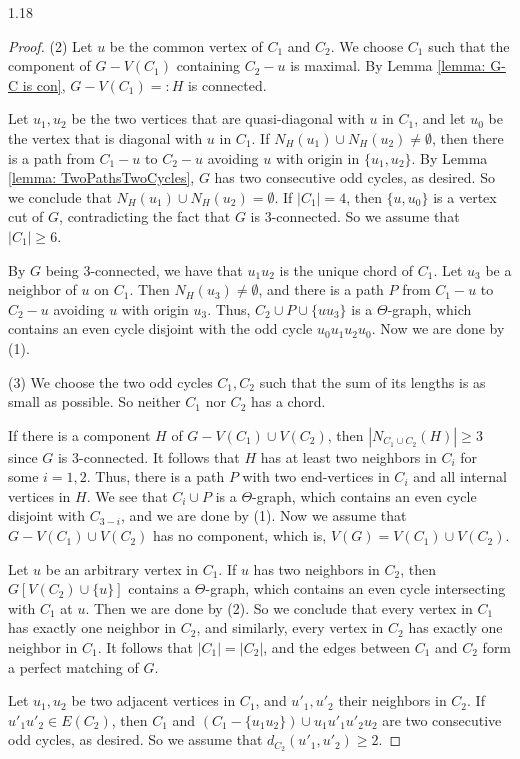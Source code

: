 \documentclass[10pt]{article}
\begin{document}
\begin{spacing}{1.18}
\begin{proof}
    (2) Let $u$ be the common vertex of $C_1$ and $C_2$. We choose $C_1$ such that the component of $G-V(C_1)$ containing $C_2-u$ is maximal. By Lemma \ref{lemma: G-C is con}, $G-V(C_1)=:H$ is connected.

    Let $u_1,u_2$ be the two vertices that are quasi-diagonal with $u$ in $C_1$, and let $u_0$ be the vertex that is diagonal with $u$ in $C_1$. If $N_H(u_1)\cup N_H(u_2)\neq\emptyset$, then there is a path from $C_1-u$ to $C_2-u$ avoiding $u$ with origin in $\{u_1,u_2\}$. By Lemma \ref{lemma: TwoPathsTwoCycles}, $G$ has two consecutive odd cycles, as desired. So we conclude that $N_H(u_1)\cup N_H(u_2)=\emptyset$. If $|C_1|=4$, then $\{u,u_0\}$ is a vertex cut of $G$, contradicting the fact that $G$ is 3-connected. So we assume that $|C_1|\geqslant 6$. 
    
    By $G$ being 3-connected, we have that $u_1u_2$ is the unique chord of $C_1$. Let $u_3$ be a neighbor of $u$ on $C_1$. Then $N_H(u_3)\neq\emptyset$, and there is a path $P$ from $C_1-u$ to $C_2-u$ avoiding $u$ with origin $u_3$. Thus, $C_2\cup P\cup\{uu_3\}$ is a $\varTheta$-graph, which contains an even cycle disjoint with the odd cycle $u_0u_1u_2u_0$. Now we are done by (1).

    (3) We choose the two odd cycles $C_1,C_2$ such that the sum of its lengths is as small as possible. So neither $C_1$ nor $C_2$ has a chord. 
    
    If there is a component $H$ of $G-V(C_1)\cup V(C_2)$, then $|N_{C_1\cup C_2}(H)|\geqslant 3$ since $G$ is 3-connected. It follows that $H$ has at least two neighbors in $C_i$ for some $i=1,2$. Thus, there is a path $P$ with two end-vertices in $C_i$ and all internal vertices in $H$. We see that $C_i\cup P$ is a $\varTheta$-graph, which contains an even cycle disjoint with $C_{3-i}$, and we are done by (1). Now we assume that $G-V(C_1)\cup V(C_2)$ has no component, which is, $V(G)=V(C_1)\cup V(C_2)$.

    Let $u$ be an arbitrary vertex in $C_1$. If $u$ has two neighbors in $C_2$, then $G[V(C_2)\cup\{u\}]$ contains a $\varTheta$-graph, which contains an even cycle intersecting with $C_1$ at $u$. Then we are done by (2). So we conclude that every vertex in $C_1$ has exactly one neighbor in $C_2$, and similarly, every vertex in $C_2$ has exactly one neighbor in $C_1$. It follows that $|C_1|=|C_2|$, and the edges between $C_1$ and $C_2$ form a perfect matching of $G$.

    Let $u_1,u_2$ be two adjacent vertices in $C_1$, and $u'_1,u'_2$ their neighbors in $C_2$. If $u'_1u'_2\in E(C_2)$, then $C_1$ and $(C_1-\{u_1u_2\})\cup u_1u'_1u'_2u_2$ are two consecutive odd cycles, as desired. So we assume that $d_{C_2}(u'_1,u'_2)\geqslant 2$.


\end{proof}
\end{spacing}
\end{document}
